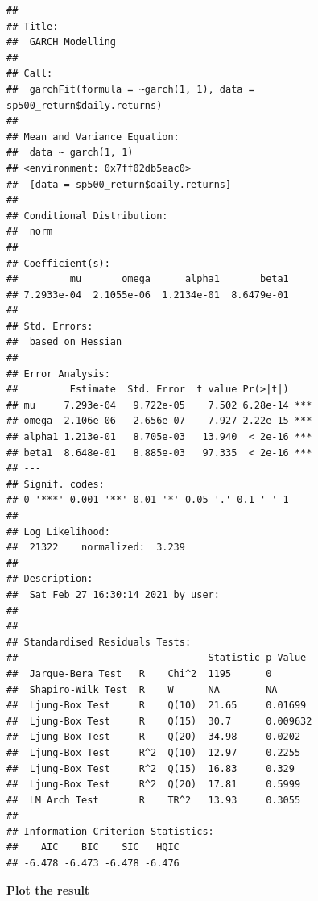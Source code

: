 \documentclass[]{book}
\newenvironment{Shaded}{\begin{snugshade}}{\end{snugshade}}
\newcommand{\DataTypeTok}[1]{\textcolor[rgb]{0.13,0.29,0.53}{#1}}
\newcommand{\DecValTok}[1]{\textcolor[rgb]{0.00,0.00,0.81}{#1}}
\newcommand{\KeywordTok}[1]{\textcolor[rgb]{0.13,0.29,0.53}{\textbf{#1}}}
\newcommand{\NormalTok}[1]{#1}
\newcommand{\OperatorTok}[1]{\textcolor[rgb]{0.81,0.36,0.00}{\textbf{#1}}}
\newcommand{\StringTok}[1]{\textcolor[rgb]{0.31,0.60,0.02}{#1}}
\begin{document}
\begin{Shaded}
\end{Shaded}

\begin{verbatim}
## 
## Title:
##  GARCH Modelling 
## 
## Call:
##  garchFit(formula = ~garch(1, 1), data = sp500_return$daily.returns) 
## 
## Mean and Variance Equation:
##  data ~ garch(1, 1)
## <environment: 0x7ff02db5eac0>
##  [data = sp500_return$daily.returns]
## 
## Conditional Distribution:
##  norm 
## 
## Coefficient(s):
##         mu       omega      alpha1       beta1  
## 7.2933e-04  2.1055e-06  1.2134e-01  8.6479e-01  
## 
## Std. Errors:
##  based on Hessian 
## 
## Error Analysis:
##         Estimate  Std. Error  t value Pr(>|t|)    
## mu     7.293e-04   9.722e-05    7.502 6.28e-14 ***
## omega  2.106e-06   2.656e-07    7.927 2.22e-15 ***
## alpha1 1.213e-01   8.705e-03   13.940  < 2e-16 ***
## beta1  8.648e-01   8.885e-03   97.335  < 2e-16 ***
## ---
## Signif. codes:  
## 0 '***' 0.001 '**' 0.01 '*' 0.05 '.' 0.1 ' ' 1
## 
## Log Likelihood:
##  21322    normalized:  3.239 
## 
## Description:
##  Sat Feb 27 16:30:14 2021 by user:  
## 
## 
## Standardised Residuals Tests:
##                                 Statistic p-Value 
##  Jarque-Bera Test   R    Chi^2  1195      0       
##  Shapiro-Wilk Test  R    W      NA        NA      
##  Ljung-Box Test     R    Q(10)  21.65     0.01699 
##  Ljung-Box Test     R    Q(15)  30.7      0.009632
##  Ljung-Box Test     R    Q(20)  34.98     0.0202  
##  Ljung-Box Test     R^2  Q(10)  12.97     0.2255  
##  Ljung-Box Test     R^2  Q(15)  16.83     0.329   
##  Ljung-Box Test     R^2  Q(20)  17.81     0.5999  
##  LM Arch Test       R    TR^2   13.93     0.3055  
## 
## Information Criterion Statistics:
##    AIC    BIC    SIC   HQIC 
## -6.478 -6.473 -6.478 -6.476
\end{verbatim}

\textbf{Plot the result}
\end{document}
